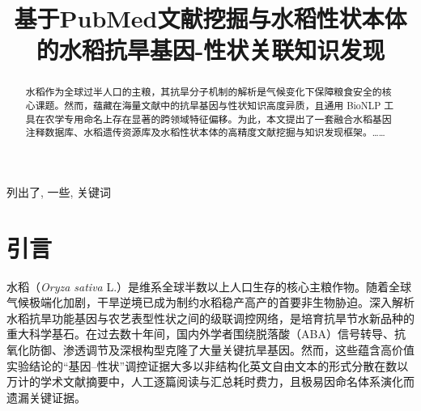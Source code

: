 \documentclass[conference]{IEEEtran}
\begin{document}
\title{基于PubMed文献挖掘与水稻性状本体的水稻抗旱基因-性状关联知识发现}

\author{
}

\maketitle

\begin{abstract}
水稻作为全球过半人口的主粮，其抗旱分子机制的解析是气候变化下保障粮食安全的核心课题。然而，蕴藏在海量文献中的抗旱基因与性状知识高度异质，且通用 BioNLP 工具在农学专用命名上存在显著的跨领域特征偏移。为此，本文提出了一套融合水稻基因注释数据库、水稻遗传资源库及水稻性状本体的高精度文献挖掘与知识发现框架。……
\end{abstract}

\begin{IEEEkeywords}
列出了, 一些, 关键词
\end{IEEEkeywords}

\section{引言}

水稻（\textit{Oryza sativa} L.）是维系全球半数以上人口生存的核心主粮作物。随着全球气候极端化加剧，干旱逆境已成为制约水稻稳产高产的首要非生物胁迫。深入解析水稻抗旱功能基因与农艺表型性状之间的级联调控网络，是培育抗旱节水新品种的重大科学基石。在过去数十年间，国内外学者围绕脱落酸（ABA）信号转导、抗氧化防御、渗透调节及深根构型克隆了大量关键抗旱基因。然而，这些蕴含高价值实验结论的“基因--性状”调控证据大多以非结构化英文自由文本的形式分散在数以万计的学术文献摘要中，人工逐篇阅读与汇总耗时费力，且极易因命名体系演化而遗漏关键证据。
\end{document}

